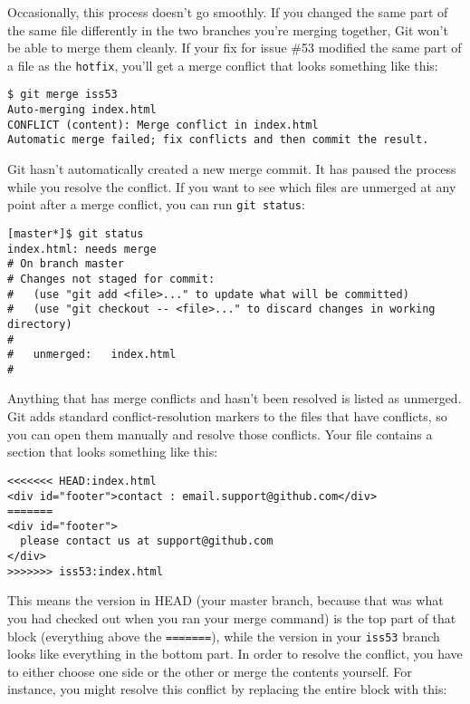 \documentclass[a4paper]{book}
\begin{document}
Occasionally, this process doesn't go smoothly. If you changed the same part of the same file differently in the two branches you're merging together, Git won't be able to merge them cleanly. If your fix for issue \#53 modified the same part of a file as the \texttt{hotfix}, you'll get a merge conflict that looks something like this:

\begin{shaded}\begin{verbatim}
$ git merge iss53
Auto-merging index.html
CONFLICT (content): Merge conflict in index.html
Automatic merge failed; fix conflicts and then commit the result.
\end{verbatim}\end{shaded}

Git hasn't automatically created a new merge commit. It has paused the process while you resolve the conflict. If you want to see which files are unmerged at any point after a merge conflict, you can run \texttt{git status}:

\begin{shaded}\begin{verbatim}
[master*]$ git status
index.html: needs merge
# On branch master
# Changes not staged for commit:
#   (use "git add <file>..." to update what will be committed)
#   (use "git checkout -- <file>..." to discard changes in working directory)
#
#	unmerged:   index.html
#
\end{verbatim}\end{shaded}

Anything that has merge conflicts and hasn't been resolved is listed as unmerged. Git adds standard conflict-resolution markers to the files that have conflicts, so you can open them manually and resolve those conflicts. Your file contains a section that looks something like this:

\begin{shaded}\begin{verbatim}
<<<<<<< HEAD:index.html
<div id="footer">contact : email.support@github.com</div>
=======
<div id="footer">
  please contact us at support@github.com
</div>
>>>>>>> iss53:index.html
\end{verbatim}\end{shaded}

This means the version in HEAD (your master branch, because that was what you had checked out when you ran your merge command) is the top part of that block (everything above the \texttt{=======}), while the version in your \texttt{iss53} branch looks like everything in the bottom part. In order to resolve the conflict, you have to either choose one side or the other or merge the contents yourself. For instance, you might resolve this conflict by replacing the entire block with this:
\end{document}
